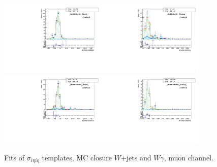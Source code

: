 \begin{figure}[htb]
\begin{center}
   \includegraphics[width=0.45\textwidth]{../figs/figs_v11/MUON_WGamma/MCclosureWjetsPlusWg/c_TEMPL_SIHIH_UNblind__phoEt95to120__Barrel__RooFit_MCclosure.pdf}\includegraphics[width=0.45\textwidth]{../figs/figs_v11/MUON_WGamma/MCclosureWjetsPlusWg/c_TEMPL_SIHIH_UNblind__phoEt95to120__Endcap__RooFit_MCclosure.pdf}\\
   \includegraphics[width=0.45\textwidth]{../figs/figs_v11/MUON_WGamma/MCclosureWjetsPlusWg/c_TEMPL_SIHIH_UNblind__phoEt120to500__Barrel__RooFit_MCclosure.pdf}\includegraphics[width=0.45\textwidth]{../figs/figs_v11/MUON_WGamma/MCclosureWjetsPlusWg/c_TEMPL_SIHIH_UNblind__phoEt120to500__Endcap__RooFit_MCclosure.pdf}\\
  \label{fig:templateFits_MCclosureWjetsPlusWg_SIHIH_MUON_3}
  \caption{Fits of $\sigma_{i \eta i \eta}$ templates, MC closure $W$+jets and $W\gamma$, muon channel.}
  \end{center}
\end{figure}











